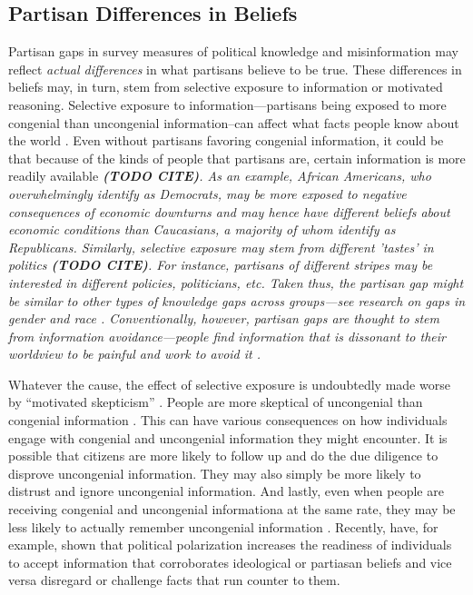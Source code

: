 \documentclass[12pt, letterpaper]{article}
\newcommand{\bgcd} {\color{purple}\em }
\newcommand{\ech}{\color{black}\rm  }    %
\begin{document}
\subsection*{Partisan Differences in Beliefs}
Partisan gaps in survey measures of political knowledge and misinformation may reflect \emph{actual differences} in what partisans believe to be true. These differences in beliefs may, in turn, stem from selective exposure to information or motivated reasoning. Selective exposure to information---partisans being exposed to more congenial than uncongenial information--can affect what facts people know about the world \citep{redlawsk2002hot,stroud_2010}. Even without partisans favoring congenial information, it could be that because of the kinds of people that partisans are, certain information is more readily available \bgcd \textbf{(TODO CITE)}\ech. As an example, African Americans, who overwhelmingly identify as Democrats, may be more exposed to negative consequences of economic downturns and may hence have different beliefs about economic conditions than Caucasians, a majority of whom identify as Republicans. Similarly, selective exposure may stem from different 'tastes' in politics \bgcd \textbf{(TODO CITE)}\ech. For instance, partisans of different stripes may be interested in different policies, politicians, etc. Taken thus, the partisan gap might be similar to other types of knowledge gaps across groups---see research on gaps in gender \citep{dolan2011women, barabas2014question} and race \citep{abrajano2015reexamining}. Conventionally, however, partisan gaps are thought to stem from information avoidance---people find information that is dissonant to their worldview to be painful and work to avoid it  \citep[e.g.,][]{abelson1959modes,festinger1962theory}.

Whatever the cause, the effect of selective exposure is undoubtedly made worse by ``motivated skepticism'' \citep{taber2006, stroud2008media}. People are more skeptical of uncongenial than congenial information \citep{Zaller1992}. This can have various consequences on how individuals engage with congenial and uncongenial information they might encounter. It is possible that citizens are more likely to follow up and do the due diligence to disprove uncongenial information. They may also simply be more likely to distrust and ignore uncongenial information. And lastly, even when people are receiving congenial and uncongenial informationa at the same rate, they may be less likely to actually remember uncongenial information \citep[see, for example][]{bayes2020and,hill2017learning,flynn2017nature, taber2006}. Recently,  \citet{peterson2021partisan} have, for example, shown that political polarization increases the readiness of individuals to accept information that corroborates ideological or partiasan beliefs and vice versa disregard or challenge facts that run counter to them.
\end{document}
